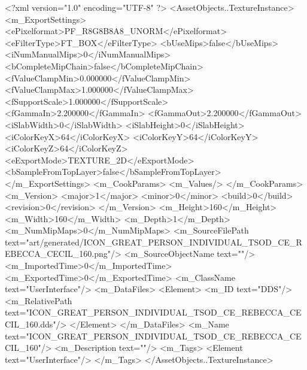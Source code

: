 <?xml version="1.0" encoding="UTF-8" ?>
<AssetObjects..TextureInstance>
	<m_ExportSettings>
		<ePixelformat>PF_R8G8B8A8_UNORM</ePixelformat>
		<eFilterType>FT_BOX</eFilterType>
		<bUseMips>false</bUseMips>
		<iNumManualMips>0</iNumManualMips>
		<bCompleteMipChain>false</bCompleteMipChain>
		<fValueClampMin>0.000000</fValueClampMin>
		<fValueClampMax>1.000000</fValueClampMax>
		<fSupportScale>1.000000</fSupportScale>
		<fGammaIn>2.200000</fGammaIn>
		<fGammaOut>2.200000</fGammaOut>
		<iSlabWidth>0</iSlabWidth>
		<iSlabHeight>0</iSlabHeight>
		<iColorKeyX>64</iColorKeyX>
		<iColorKeyY>64</iColorKeyY>
		<iColorKeyZ>64</iColorKeyZ>
		<eExportMode>TEXTURE_2D</eExportMode>
		<bSampleFromTopLayer>false</bSampleFromTopLayer>
	</m_ExportSettings>
	<m_CookParams>
		<m_Values/>
	</m_CookParams>
	<m_Version>
		<major>1</major>
		<minor>0</minor>
		<build>0</build>
		<revision>0</revision>
	</m_Version>
	<m_Height>160</m_Height>
	<m_Width>160</m_Width>
	<m_Depth>1</m_Depth>
	<m_NumMipMaps>0</m_NumMipMaps>
	<m_SourceFilePath text="art/generated/ICON_GREAT_PERSON_INDIVIDUAL_TSOD_CE_REBECCA_CECIL_160.png"/>
	<m_SourceObjectName text=""/>
	<m_ImportedTime>0</m_ImportedTime>
	<m_ExportedTime>0</m_ExportedTime>
	<m_ClassName text="UserInterface"/>
	<m_DataFiles>
		<Element>
			<m_ID text="DDS"/>
			<m_RelativePath text="ICON_GREAT_PERSON_INDIVIDUAL_TSOD_CE_REBECCA_CECIL_160.dds"/>
		</Element>
	</m_DataFiles>
	<m_Name text="ICON_GREAT_PERSON_INDIVIDUAL_TSOD_CE_REBECCA_CECIL_160"/>
	<m_Description text=""/>
	<m_Tags>
		<Element text="UserInterface"/>
	</m_Tags>
</AssetObjects..TextureInstance>
